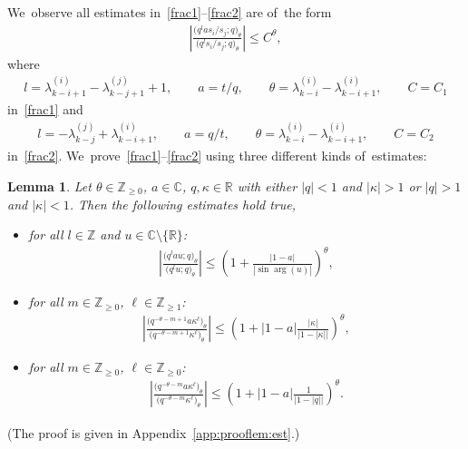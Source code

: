 \documentclass[pdftex]{sigma}%
\numberwithin{equation}{section}
\newtheorem{Lemma}[Theorem]{Lemma}
\newcommand{\R}{{\mathbb R}}
\newcommand{\C}{{\mathbb C}}
\newcommand{\Z}{{\mathbb Z}}
\begin{document}
We~observe all estimates in~\eqref{frac1}--\eqref{frac2} are of~the form
\begin{gather*}
\left|\frac{\big(q^{l}as_i/s_j;q\big)_\theta}{\big(q^l s_i/s_j;q\big)_\theta}\right|\leq C^\theta,
\end{gather*}
where
\begin{gather}
\label{first}
l= \lambda^{(i)}_{k-i+1} - \lambda^{(j)}_{k-j+1}+1,\qquad
a=t/q,\qquad
\theta= \lambda^{(i)}_{k-i}-\lambda^{(i)}_{k-i+1},\qquad
C=C_1
\end{gather}
in~\eqref{frac1} and
\begin{gather}
\label{second}
l=-\lambda^{(j)}_{k-j}+\lambda^{(i)}_{k-i+1},\qquad
a=q/t,\qquad
\theta= \lambda^{(i)}_{k-i}-\lambda^{(i)}_{k-i+1},\qquad
C=C_2
\end{gather}
in~\eqref{frac2}. We~prove~\eqref{frac1}--\eqref{frac2} using three different kinds of~estimates:

\begin{Lemma}\label{lem:est}
Let $\theta\in\Z_{\geq 0}$, $a\in\C$, $q, \kappa\in\R$ with either $|q|<1$ and $|\kappa|>1$ or $|q|>1$ and $|\kappa|<1$. Then the following estimates hold true,
\begin{itemize}\itemsep=0pt
\item[$(a)$] for all $l\in\Z$ and $u\in\C\setminus\{\R\}$:
\begin{gather}\label{esta}
\left| \frac{\big(q^{l}au;q\big)_\theta}{\big(q^l u;q\big)_\theta}\right|\leq \left( 1 + \frac{|1-a|}{|\sin\arg(u)|}\right)^\theta\!,
\end{gather}
\item[$(b)$] for all $m\in\Z_{\geq 0}$, $\ell\in\Z_{\geq 1}$:
\begin{gather}\label{estb}
\left|\frac{\big( q^{-\theta-m+1} a \kappa^\ell \big)_\theta}{\big(q^{-\theta-m+1} \kappa^\ell \big)_\theta} \right| \leq \left(1+|1-a|\frac{|\kappa|}{|1-|\kappa||} \right)^\theta\!,
\end{gather}
\item[$(c)$] for all $m\in\Z_{\geq 0}$, $\ell\in\Z_{\geq 0}$:
\begin{gather}\label{estc}
\left|\frac{\big( q^{-\theta-m} a \kappa^\ell \big)_\theta}{\big(q^{-\theta-m} \kappa^\ell \big)_\theta} \right| \leq \left(1+|1-a|\frac{1}{|1-|q||} \right)^\theta\!.
\end{gather}
\end{itemize}
\end{Lemma}
(The proof is given in Appendix~\ref{app:prooflem:est}.)
\end{document}
